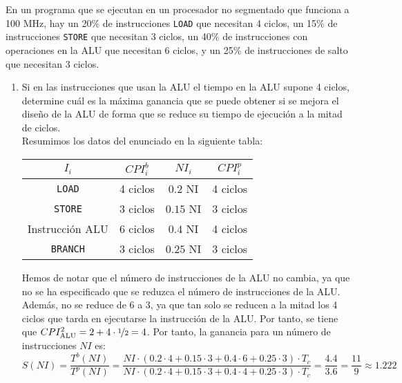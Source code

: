 \begin{ejercicio}
    En un programa que se ejecutan en un procesador no segmentado que funciona a 100 MHz, hay
    un 20\% de instrucciones \verb|LOAD| que necesitan 4 ciclos, un 15\% de instrucciones \verb|STORE| que necesitan 3 ciclos,
    un 40\% de instrucciones con operaciones en la ALU que necesitan 6 ciclos, y un 25\% de instrucciones de
    salto que necesitan 3 ciclos.
    \begin{enumerate}
        \item\label{ej:1.7a}
        Si en las instrucciones que usan la ALU el tiempo en la ALU supone 4 ciclos, determine cuál es la máxima ganancia que se puede obtener si se mejora el diseño de la ALU de forma que
        se reduce su tiempo de ejecución a la mitad de ciclos.\\

        Resumimos los datos del enunciado en la siguiente tabla:
        \begin{table}[H]
            \centering
            \begin{tabular}{c|c|c||c}
                $I_i$ & $CPI_i^b$ & $NI_i$ & $CPI_i^p$ \\
                \hline
                \verb|LOAD| & 4 ciclos & $0.2$ NI & 4 ciclos \\ 
                \verb|STORE| & 3 ciclos & $0.15$ NI & 3 ciclos \\
                Instrucción ALU & 6 ciclos & $0.4$ NI & 4 ciclos \\
                \verb|BRANCH| & 3 ciclos & $0.25$ NI & 3 ciclos
            \end{tabular}
        \end{table}
        Hemos de notar que el número de instrucciones de la ALU no cambia, ya que no se ha especificado que se reduzca el número de instrucciones de la ALU.
        Además, no se reduce de 6 a 3, ya que tan solo se reducen a la mitad los 4 ciclos que tarda en ejecutarse la instrucción de la ALU.
        Por tanto, se tiene que $CPI_{\text{ALU}}^2 = 2+4\cdot \nicefrac{1}{2} = 4$.
        Por tanto, la ganancia para un número de instrucciones $NI$ es:
        \begin{equation*}
            S (NI) = \frac{T^b(NI)}{T^p(NI)} = \frac{NI \cdot (0.2\cdot 4 + 0.15\cdot 3 + 0.4\cdot 6 + 0.25\cdot 3) \cdot T_c}{NI \cdot (0.2\cdot 4 + 0.15\cdot 3 + 0.4\cdot 4 + 0.25\cdot 3) \cdot T_c} = \frac{4.4}{3.6} = \frac{11}{9} \approx 1.222
        \end{equation*}
        

\end{enumerate}
\end{ejercicio}
